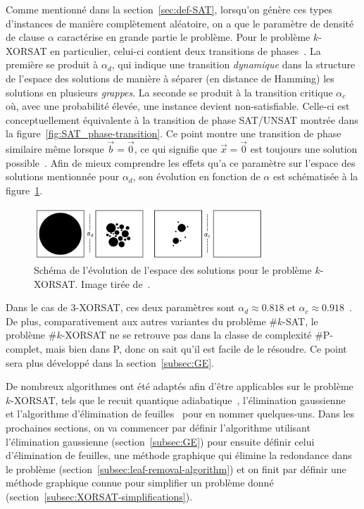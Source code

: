 Comme mentionné dans la section~\ref{sec:def-SAT}, lorsqu'on génère ces types d'instances de manière complètement aléatoire, on a que le paramètre de densité de clause $\alpha$ caractérise en grande partie le problème.
Pour le problème $k$-XORSAT en particulier, celui-ci contient deux transitions de phases~\cite{mezard_alternative_2002}.
La première se produit à $\alpha_d$, qui indique une transition \emph{dynamique} dans la structure de l'espace des solutions de manière à séparer (en distance de Hamming) les solutions en plusieurs \emph{grappes}.
La seconde se produit à la transition critique $\alpha_c$ où, avec une probabilité élevée, une instance devient non-satisfiable.
Celle-ci est conceptuellement équivalente à la transition de phase SAT/UNSAT montrée dans la figure~\ref{fig:SAT_phase-transition}.
Ce point montre une transition de phase similaire même lorsque $\vec{b} = \vec{0}$, ce qui signifie que $\vec{x} = \vec{0}$ est toujours une solution possible~\cite{ricci2001simplest}.
Afin de mieux comprendre les effets qu'a ce paramètre sur l'espace des solutions mentionnée pour $\alpha_d$, son évolution en fonction de $\alpha$ est schématisée à la figure~\ref{fig:solution-space}.
\begin{figure}[h]
    \centering
    \includegraphics[width=0.77\textwidth]{Figures/solution_space_evolution.jpeg}
    \caption[Schéma de l'évolution de l'espace des solutions pour le problème \mbox{$k$-XORSAT}.]{Schéma de l'évolution de l'espace des solutions pour le problème \mbox{$k$-XORSAT}. Image tirée de~\protect\cite{moore_nature_2011}.}
    \label{fig:solution-space}
\end{figure}
Dans le cas de $3$-XORSAT, ces deux paramètres sont $\alpha_d \approx 0.818$ et $\alpha_c \approx 0.918$~\cite{mezard_alternative_2002}.
De plus, comparativement aux autres variantes du problème \#$k$-SAT, le problème \#$k$-XORSAT ne se retrouve pas dans la classe de complexité \#P-complet, mais bien dans P, donc on sait qu'il est facile de le résoudre.
Ce point sera plus développé dans la section~\ref{subsec:GE}.

De nombreux algorithmes ont été adaptés afin d'être applicables sur le problème $k$-XORSAT, tels que le recuit quantique adiabatique~\cite{patil_obstacles_2019}, l'élimination gaussienne~\cite{braunstein_complexity_2002} et l'algorithme d'élimination de feuilles~\cite{mezard_alternative_2002} pour en nommer quelques-uns.
Dans les prochaines sections, on va commencer par définir l'algorithme utilisant l'élimination gaussienne (section~\ref{subsec:GE}) pour ensuite définir celui d'élimination de feuilles, une méthode graphique qui élimine la redondance dans le problème (section~\ref{subsec:leaf-removal-algorithm}) et on finit par définir une méthode graphique connue pour simplifier un problème donné (section~\ref{subsec:XORSAT-simplifications}).

